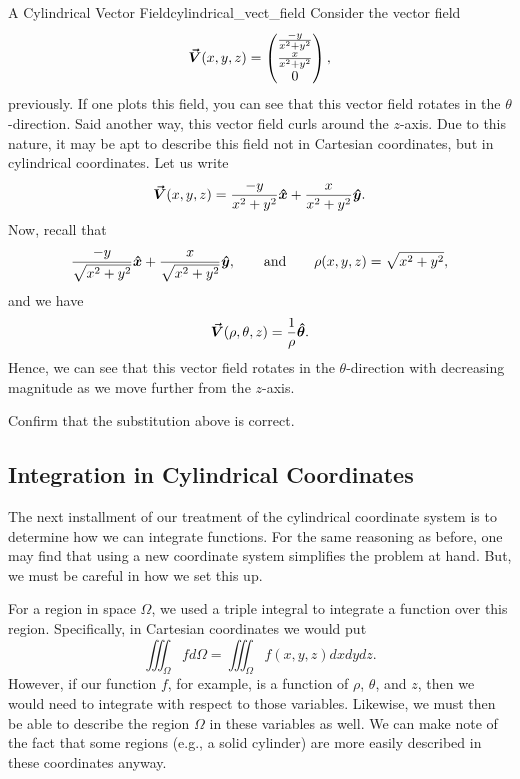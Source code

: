 \begin{ex}{A Cylindrical Vector Field}{cylindrical_vect_field}
    Consider the vector field
    \[
    \boldsymbol{\vec{V}}(x,y,z) = \begin{pmatrix} \frac{-y}{x^2+y^2} \\ \frac{x}{x^2+y^2} \\ 0 \end{pmatrix},
    \]
    previously.  If one plots this field, you can see that this vector field rotates in the $\theta$-direction. Said another way, this vector field curls around the $z$-axis.  Due to this nature, it may be apt to describe this field not in Cartesian coordinates, but in cylindrical coordinates.  Let us write
    \[
    \boldsymbol{\vec{V}}(x,y,z) = \frac{-y}{x^2+y^2}\boldsymbol{\hat{x}} + \frac{x}{x^2+y^2}\boldsymbol{\hat{y}}.
    \]
    Now, recall that
    \[
    \frac{-y}{\sqrt{x^2+y^2}}\boldsymbol{\hat{x}} + \frac{x}{\sqrt{x^2+y^2}}\boldsymbol{\hat{y}}, \qquad \textrm{and} \qquad \rho(x,y,z) = \sqrt{x^2+y^2},
    \]
    and we have
    \[
    \boldsymbol{\vec{V}}(\rho,\theta,z) = \frac{1}{\rho} \boldsymbol{\hat{\theta}}.
    \]
    Hence, we can see that this vector field rotates in the $\theta$-direction with decreasing magnitude as we move further from the $z$-axis.
\end{ex}

\begin{exercise}
    Confirm that the substitution above is correct.
\end{exercise}

\subsection{Integration in Cylindrical Coordinates}

The next installment of our treatment of the cylindrical coordinate system is to determine how we can integrate functions.  For the same reasoning as before, one may find that using a new coordinate system simplifies the problem at hand.  But, we must be careful in how we set this up.

For a region in space $\Omega$, we used a triple integral to integrate a function over this region.  Specifically, in Cartesian coordinates we would put
\[
\iiint_\Omega f d\Omega = \iiint_\Omega f(x,y,z) dxdydz.
\]
However, if our function $f$, for example, is a function of $\rho$, $\theta$, and $z$, then we would need to integrate with respect to those variables.  Likewise, we must then be able to describe the region $\Omega$ in these variables as well.  We can make note of the fact that some regions (e.g., a solid cylinder) are more easily described in these coordinates anyway.

